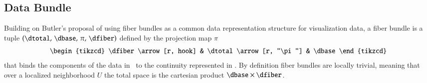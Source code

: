 \documentclass[journal]{vgtc}                %
\begin{document}
\subsection{Data Bundle}
\label{sec:math:data}
Building on Butler's proposal of using fiber bundles as a common data representation structure for visualization data\cite{butlerVectorBundleClassesForm1992, butlerVisualizationModelBased1989}, a fiber bundle is a tuple $(\dtotal,\,\dbase,\,\pi ,\,\dfiber)$ defined by the projection map $\pi$
\begin{equation}
    \label{eq:fiber_bundle}
    \begin{tikzcd}
        \dfiber \arrow[r, hook] & \dtotal \arrow[r, "\pi"] & \dbase
    \end{tikzcd}
\end{equation}
that binds the components of the data in \dfiber\ to the continuity represented in \dbase. By definition fiber bundles are locally trivial\cite{spanier1989algebraic,LocallyTrivialFibre}, meaning that over a localized neighborhood $U$ the total space is the cartesian product $\dbase\times\dfiber$. 
\end{document}
